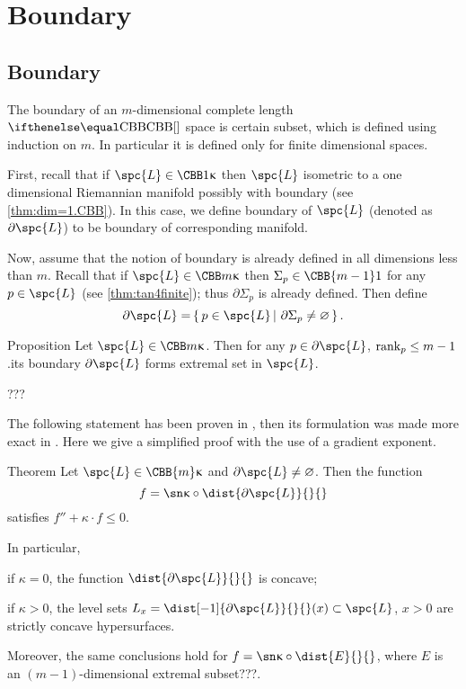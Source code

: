 \chapter{Boundary}


\section{Boundary}\label{sec:bry}

The boundary of an $m$-dimensional complete length $\Alex{}$ space is certain subset,
which is defined using induction on $m$.
In particular it is defined only for finite dimensional spaces.

First, recall that if $\spc{L}\in\CBB 1\kappa$ then $\spc{L}$ isometric to a one dimensional Riemannian manifold possibly with boundary (see \ref{thm:dim=1.CBB}).
In this case, we define boundary of $\spc{L}$ (denoted as $\partial \spc{L}$) to be boundary of corresponding manifold.

Now, assume that the notion of boundary is already defined in all dimensions less than $m$.
Recall that if $\spc{L}\in\CBB m\kappa$ then $\Sigma_p\in\CBB{m-1}1$ for any $p\in \spc{L}$ (see \ref{thm:tan4finite});
thus $\partial\Sigma_p$ is already defined.
Then define 
\[\partial \spc{L}=\set{p\in \spc{L}}{\partial\Sigma_p\not=\emptyset}.\]


\begin{thm}{Proposition}
Let $\spc{L}\in\CBB m\kappa$.
Then for any $p\in\partial\spc{L}$, $\rank_p\le m-1$.its boundary $\partial \spc{L}$ forms extremal set in $\spc{L}$. 
\end{thm}

???\qeds


The following statement has been proven in \cite{perelman:spaces2}, then its
formulation was made more exact in \cite{alexander-bishop:fk}. 
Here we give a simplified proof with the use of a gradient exponent.

\begin{thm}{Theorem} \label{thm:dist-to-bry} 
Let $\spc{L}\in\CBB{m}\kappa$ and
$\partial \spc{L}\not=\emptyset$.
Then the function 
\[f=\sn\kappa\circ\dist{\partial \spc{L}}{}{}\] 
satisfies $f''+\kappa\cdot  f\le 0$.

In particular,
\begin{subthm}{} if $\kappa=0$, the function $\dist{\partial \spc{L}}{}{}$ is concave;
\end{subthm}

\begin{subthm}{} if $\kappa>0$, the level sets $L_x=\dist[-1]{\partial \spc{L}}{}{}(x)\subset \spc{L}$, $x>0$
are strictly concave hypersurfaces.
\end{subthm}

Moreover, the same conclusions hold for $f=\sn\kappa\circ\dist{E}{}{}$, where $E$ is an $(m-1)$-dimensional extremal subset???.
\end{thm}

